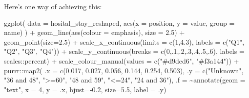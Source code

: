 \documentclass[
  letterpaper,
  DIV=11,
  numbers=noendperiod]{scrartcl}
\newenvironment{Shaded}{\begin{snugshade}}{\end{snugshade}}
\newcommand{\AttributeTok}[1]{\textcolor[rgb]{0.40,0.45,0.13}{#1}}
\newcommand{\DecValTok}[1]{\textcolor[rgb]{0.68,0.00,0.00}{#1}}
\newcommand{\FloatTok}[1]{\textcolor[rgb]{0.68,0.00,0.00}{#1}}
\newcommand{\FunctionTok}[1]{\textcolor[rgb]{0.28,0.35,0.67}{#1}}
\newcommand{\NormalTok}[1]{\textcolor[rgb]{0.00,0.23,0.31}{#1}}
\newcommand{\SpecialCharTok}[1]{\textcolor[rgb]{0.37,0.37,0.37}{#1}}
\newcommand{\StringTok}[1]{\textcolor[rgb]{0.13,0.47,0.30}{#1}}
\begin{document}
Here's one way of achieving this:

\begin{Shaded}
\begin{Highlighting}[]
\FunctionTok{ggplot}\NormalTok{(}
  \AttributeTok{data =}\NormalTok{ hosital\_stay\_reshaped,}
  \FunctionTok{aes}\NormalTok{(}\AttributeTok{x =}\NormalTok{ position, }\AttributeTok{y =}\NormalTok{ value, }\AttributeTok{group =}\NormalTok{ name)}
\NormalTok{) }\SpecialCharTok{+}
  \FunctionTok{geom\_line}\NormalTok{(}\FunctionTok{aes}\NormalTok{(}\AttributeTok{colour =}\NormalTok{ emphasis), }\AttributeTok{size =} \FloatTok{2.5}\NormalTok{) }\SpecialCharTok{+}
  \FunctionTok{geom\_point}\NormalTok{(}\AttributeTok{size=}\FloatTok{2.5}\NormalTok{) }\SpecialCharTok{+}
  \FunctionTok{scale\_x\_continuous}\NormalTok{(}\AttributeTok{limits =} \FunctionTok{c}\NormalTok{(}\DecValTok{1}\NormalTok{,}\FloatTok{4.3}\NormalTok{), }\AttributeTok{labels =} \FunctionTok{c}\NormalTok{(}\StringTok{"Q1"}\NormalTok{, }\StringTok{"Q2"}\NormalTok{, }\StringTok{"Q3"}\NormalTok{, }\StringTok{"Q4"}\NormalTok{)) }\SpecialCharTok{+}
  \FunctionTok{scale\_y\_continuous}\NormalTok{(}\AttributeTok{breaks =} \FunctionTok{c}\NormalTok{(}\DecValTok{0}\NormalTok{,.}\DecValTok{1}\NormalTok{,.}\DecValTok{2}\NormalTok{,.}\DecValTok{3}\NormalTok{,.}\DecValTok{4}\NormalTok{,.}\DecValTok{5}\NormalTok{,.}\DecValTok{6}\NormalTok{), }\AttributeTok{labels =}\NormalTok{ scales}\SpecialCharTok{::}\NormalTok{percent) }\SpecialCharTok{+}
  \FunctionTok{scale\_colour\_manual}\NormalTok{(}\AttributeTok{values =} \FunctionTok{c}\NormalTok{(}\StringTok{"\#d9ded6"}\NormalTok{, }\StringTok{"\#f3a144"}\NormalTok{)) }\SpecialCharTok{+}
\NormalTok{  purrr}\SpecialCharTok{::}\FunctionTok{map2}\NormalTok{(}
    \AttributeTok{.x =} \FunctionTok{c}\NormalTok{(}\FloatTok{0.017}\NormalTok{, }\FloatTok{0.027}\NormalTok{, }\FloatTok{0.056}\NormalTok{, }\FloatTok{0.144}\NormalTok{, }\FloatTok{0.254}\NormalTok{, }\FloatTok{0.503}\NormalTok{),}
    \AttributeTok{.y =} \FunctionTok{c}\NormalTok{(}\StringTok{"Unknown"}\NormalTok{, }\StringTok{"36 and 48"}\NormalTok{, }\StringTok{"\textgreater{}=60"}\NormalTok{, }\StringTok{"48 and 59"}\NormalTok{, }\StringTok{"\textless{}=24"}\NormalTok{, }\StringTok{"24 and 36"}\NormalTok{),}
    \AttributeTok{.f =} \SpecialCharTok{\textasciitilde{}}\FunctionTok{annotate}\NormalTok{(}\AttributeTok{geom =} \StringTok{"text"}\NormalTok{, }\AttributeTok{x =} \DecValTok{4}\NormalTok{, }\AttributeTok{y =}\NormalTok{ .x, }\AttributeTok{hjust=}\SpecialCharTok{{-}}\FloatTok{0.2}\NormalTok{, }\AttributeTok{size=}\FloatTok{5.5}\NormalTok{, }\AttributeTok{label =}\NormalTok{ .y)}

\end{Highlighting}
\end{Shaded}
\end{document}
